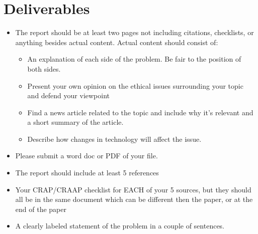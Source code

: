\documentclass[12pt]{article}
\begin{document}
    

\section*{Deliverables}

\begin{itemize}
    \item The report should be at least two pages not including citations, checklists, or anything besides actual content. Actual content should consist of:
        \begin{itemize}
            \item An explanation of each side of the problem. Be fair to the position of both sides.
            \item Present your own opinion on the ethical issues surrounding your topic and defend your viewpoint
            \item Find a news article related to the topic and include why it's relevant and a short summary of the article. 
            \item Describe how changes in technology will affect the issue.
        \end{itemize}
    \item Please submit a word doc or PDF of your file. 
    \item The report should include at least 5 references
    \item Your CRAP/CRAAP checklist for EACH of your 5 sources, but they should all be in the same document which can be different then the paper, or at the end of the paper
    \item A clearly labeled statement of the problem in a couple of sentences.

\end{itemize}
\end{document}
